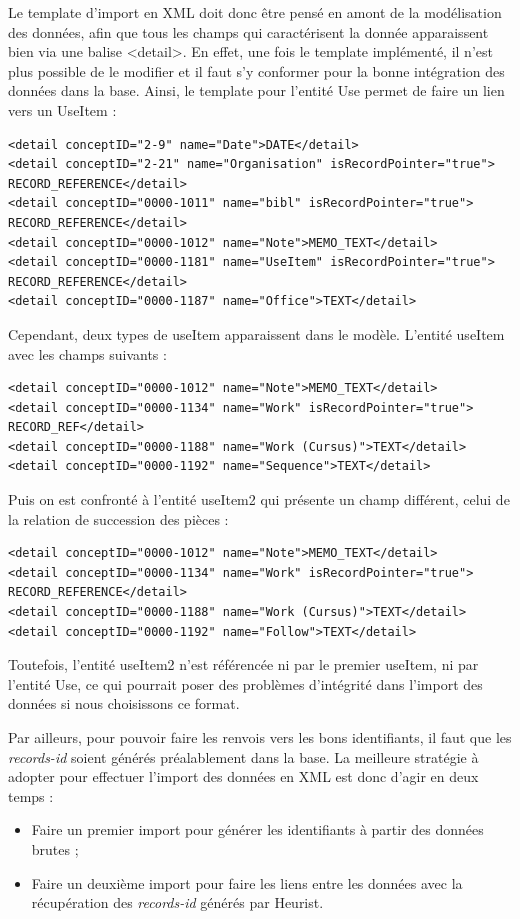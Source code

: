 \documentclass[a4paper,12pt,twoside]{book}
\begin{document}
	Le template d'import en XML doit donc être pensé en amont de la modélisation des données, afin que tous les champs qui caractérisent la donnée apparaissent bien via une balise \textless detail\textgreater . En effet, une fois le template implémenté, il n'est plus possible de le modifier et il faut s'y conformer pour la bonne intégration des données dans la base. Ainsi, le template pour l'entité Use permet de faire un lien vers un UseItem :
	\begin{verbatim}
<detail conceptID="2-9" name="Date">DATE</detail>
<detail conceptID="2-21" name="Organisation" isRecordPointer="true">
RECORD_REFERENCE</detail>
<detail conceptID="0000-1011" name="bibl" isRecordPointer="true">
RECORD_REFERENCE</detail>
<detail conceptID="0000-1012" name="Note">MEMO_TEXT</detail>
<detail conceptID="0000-1181" name="UseItem" isRecordPointer="true">
RECORD_REFERENCE</detail>
<detail conceptID="0000-1187" name="Office">TEXT</detail>
	\end{verbatim}
	
Cependant, deux types de useItem apparaissent dans le modèle. L'entité useItem avec les champs suivants :
	\begin{verbatim}
<detail conceptID="0000-1012" name="Note">MEMO_TEXT</detail>
<detail conceptID="0000-1134" name="Work" isRecordPointer="true">
RECORD_REF</detail>
<detail conceptID="0000-1188" name="Work (Cursus)">TEXT</detail>
<detail conceptID="0000-1192" name="Sequence">TEXT</detail>
	\end{verbatim}
Puis on est confronté à l'entité useItem2 qui présente un champ différent, celui de la relation de succession des pièces :
\begin{verbatim}
<detail conceptID="0000-1012" name="Note">MEMO_TEXT</detail>
<detail conceptID="0000-1134" name="Work" isRecordPointer="true">
RECORD_REFERENCE</detail>
<detail conceptID="0000-1188" name="Work (Cursus)">TEXT</detail>
<detail conceptID="0000-1192" name="Follow">TEXT</detail>
\end{verbatim}
Toutefois, l'entité useItem2 n'est référencée ni par le premier useItem, ni par l'entité Use, ce qui pourrait poser des problèmes d'intégrité dans l'import des données si nous choisissons ce format.

	Par ailleurs, pour pouvoir faire les renvois vers les bons identifiants, il faut que les \textit{records-id} soient générés préalablement dans la base. La meilleure stratégie à adopter pour effectuer l'import des données en XML est donc d'agir en deux temps :
	\begin{itemize}
	    \item Faire un premier import pour générer les identifiants à partir des données brutes ;
	    \item Faire un deuxième import pour faire les liens entre les données avec la récupération des \textit{records-id} générés par Heurist.
	\end{itemize}
	
\end{document}
